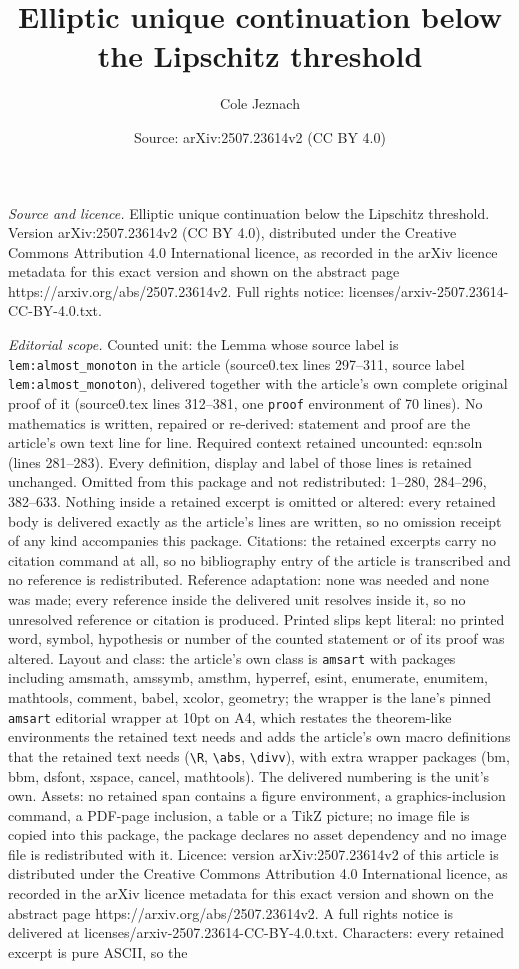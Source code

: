 \documentclass[10pt,a4paper]{amsart}
\title[Elliptic unique continuation below the Lipschitz threshold]{Elliptic unique continuation below the Lipschitz threshold}
\author{Cole Jeznach}
\date{Source: arXiv:2507.23614v2 (CC BY 4.0)}
\begin{document}
\maketitle

\noindent\emph{Source and licence.} Elliptic unique continuation below the Lipschitz threshold. Version arXiv:2507.23614v2 (CC BY 4.0), distributed under the Creative Commons Attribution 4.0 International licence, as recorded in the arXiv licence metadata for this exact version and shown on the abstract page https://arxiv.org/abs/2507.23614v2. Full rights notice: licenses/arxiv-2507.23614-CC-BY-4.0.txt.\par\smallskip

\noindent\textit{Editorial scope.} Counted unit: the Lemma whose source label is \texttt{lem:almost\_monoton} in the article (source0.tex lines 297--311, source label \texttt{lem:almost\_monoton}), delivered together with the article's own complete original proof of it (source0.tex lines 312--381, one \texttt{proof} environment of 70 lines). No mathematics is written, repaired or re-derived: statement and proof are the article's own text line for line. Required context retained uncounted: eqn:soln (lines 281--283). Every definition, display and label of those lines is retained unchanged. Omitted from this package and not redistributed: 1--280, 284--296, 382--633. Nothing inside a retained excerpt is omitted or altered: every retained body is delivered exactly as the article's lines are written, so no omission receipt of any kind accompanies this package. Citations: the retained excerpts carry no citation command at all, so no bibliography entry of the article is transcribed and no reference is redistributed. Reference adaptation: none was needed and none was made; every reference inside the delivered unit resolves inside it, so no unresolved reference or citation is produced. Printed slips kept literal: no printed word, symbol, hypothesis or number of the counted statement or of its proof was altered. Layout and class: the article's own class is \texttt{amsart} with packages including amsmath, amssymb, amsthm, hyperref, esint, enumerate, enumitem, mathtools, comment, babel, xcolor, geometry; the wrapper is the lane's pinned \texttt{amsart} editorial wrapper at 10pt on A4, which restates the theorem-like environments the retained text needs and adds the article's own macro definitions that the retained text needs (\texttt{\textbackslash R}, \texttt{\textbackslash abs}, \texttt{\textbackslash divv}), with extra wrapper packages (bm, bbm, dsfont, xspace, cancel, mathtools). The delivered numbering is the unit's own. Assets: no retained span contains a figure environment, a graphics-inclusion command, a PDF-page inclusion, a table or a TikZ picture; no image file is copied into this package, the package declares no asset dependency and no image file is redistributed with it. Licence: version arXiv:2507.23614v2 of this article is distributed under the Creative Commons Attribution 4.0 International licence, as recorded in the arXiv licence metadata for this exact version and shown on the abstract page https://arxiv.org/abs/2507.23614v2. A full rights notice is delivered at licenses/arxiv-2507.23614-CC-BY-4.0.txt. Characters: every retained excerpt is pure ASCII, so the 
\end{document}
